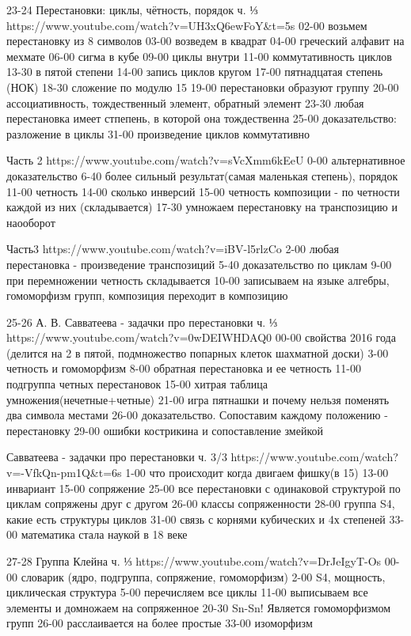 23-24
Перестановки: циклы, чётность, порядок ч. ⅓
https://www.youtube.com/watch?v=UH3xQ6ewFoY&t=5s
02-00 возьмем перестановку из 8 символов
03-00 возведем в квадрат
04-00 греческий алфавит на мехмате
06-00 сигма в кубе
09-00 циклы внутри
11-00 коммутативность циклов
13-30 в пятой степени
14-00 запись циклов кругом
17-00 пятнадцатая степень (НОК)
18-30 сложение по модулю 15
19-00 перестановки образуют группу
20-00 ассоциативность, тождественный элемент, обратный элемент
23-30 любая перестановка имеет стпепень, в которой она тождественна
25-00 доказательство: разложение в циклы
31-00 произведение циклов коммутативно

Часть 2
https://www.youtube.com/watch?v=sVcXmm6kEeU
0-00 альтернативное доказательство
6-40 более сильный результат(самая маленькая степень), порядок
11-00 четность
14-00 сколько инверсий
15-00 четность композиции - по четности каждой из них (складывается)
17-30 умножаем перестановку на транспозицию и наооборот

Часть3
https://www.youtube.com/watch?v=iBV-l5rlzCo
2-00 любая перестановка - произведение транспозиций
5-40 доказательство по циклам
9-00 при перемножении четность складывается
10-00 записываем на языке алгебры, гомоморфизм групп, композиция переходит в композицию

25-26
А. В. Савватеева - задачки про перестановки ч. ⅓
https://www.youtube.com/watch?v=0wDEIWHDAQ0
00-00 свойства 2016 года (делится на 2 в пятой, подмножество попарных клеток шахматной доски)
3-00 четность и гомоморфизм
8-00 обратная перестановка и ее четность
11-00 подгруппа четных перестановок
15-00 хитрая таблица умножения(нечетные+четные)
21-00 игра пятнашки и почему нельзя поменять два символа местами
26-00 доказательство. Сопоставим каждому положению - перестановку
29-00 ошибки кострикина и сопоставление змейкой

Савватеева - задачки про перестановки ч. 3/3
https://www.youtube.com/watch?v=-VfkQn-pm1Q&t=6s
1-00 что происходит когда двигаем фишку(в 15)
13-00 инвариант
15-00 сопряжение
25-00 все перестановки с одинаковой структурой по циклам сопряжены друг с другом
26-00 классы сопряженности
28-00 группа S4, какие есть структуры циклов
31-00 связь с корнями кубических и 4х степеней
33-00 математика стала наукой в 18 веке

27-28
Группа Клейна ч. ⅓
https://www.youtube.com/watch?v=DrJeIgyT-Os
00-00 словарик (ядро, подгруппа, сопряжение, гомоморфизм)
2-00 S4, мощность, циклическая структура
5-00 перечисляем все циклы
11-00 выписываем все элементы и домножаем на сопряженное
20-30 Sn-Sn! Является гомоморфизмом групп
26-00 расслаивается на более простые
33-00 изоморфизм

